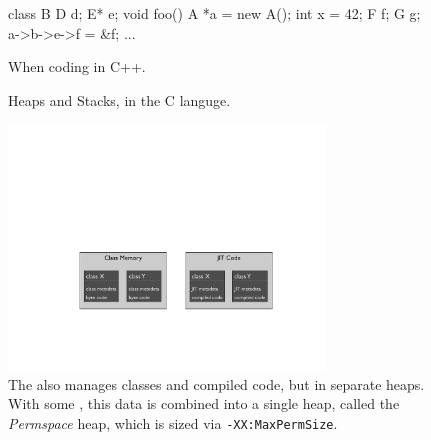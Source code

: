 \begin{figure}
\begin{subfloat}
\begin{minipage}[b]{0.4\textwidth}
\begin{shortlisting}
class B {
  D d; 
  E* e;
}
void foo() {
  A *a = new A();
  int x = 42;
  F f;
  G g;
  a->b->e->f = &f;
  ...
}
\end{shortlisting}
\end{minipage}
\caption{When coding in C++.}
\end{subfloat}
\caption{Heaps and Stacks, in the C languge.}
\end{figure}



\begin{figure}
\centering
\includegraphics[width=0.75\textwidth]{part2/Figures/lifetime/heaps_and_stacks_classes}
\caption{The \jre also manages classes and compiled code, but in separate
	heaps. With some \jres, this data is combined into a single heap, called the
	\emph{Permspace} heap, which is sized via {\tt -XX:MaxPermSize}.}
\label{fig:heaps_and_stacks_classes}
\end{figure}

